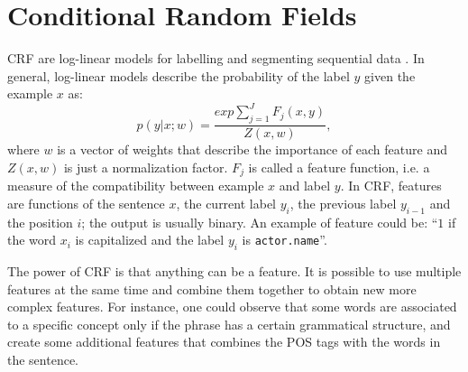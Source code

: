 \section{Conditional Random Fields}
\label{sec:crf}

\ac{CRF} are log-linear models for labelling and segmenting sequential data \cite{elkan}.
In general, log-linear models describe the probability of the label $y$ given the example $x$ as:
\begin{equation*}
    p(y|x;w) = \frac{exp \sum_{j = 1}^{J} F_{j}(x, y)}{Z(x, w)},
\end{equation*}
where $w$ is a vector of weights that describe the importance of each feature and $Z(x,w)$ is just a normalization factor.
$F_{j}$ is called a feature function, i.e. a measure of the compatibility between example $x$ and label $y$.
In \ac{CRF}, features are functions of the sentence $x$, the current label $y_{i}$, the previous label $y_{i-1}$ and the position $i$;
the output is usually binary.
An example of feature could be: ``$1$ if the word $x_i$ is capitalized and the label $y_i$ is \texttt{actor.name}''.

The power of \ac{CRF} is that anything can be a feature.
It is possible to use multiple features at the same time and combine them together to obtain new more complex features.
For instance, one could observe that some words are associated to a specific concept only if the phrase has a certain grammatical structure, and create some additional features that combines the \ac{POS} tags with the words in the sentence.
